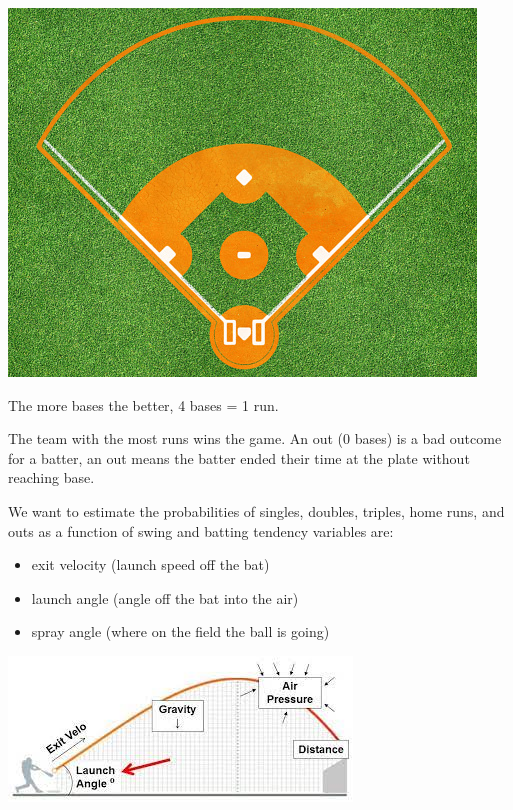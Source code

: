\documentclass[
  ignorenonframetext,
]{beamer}
\providecommand{\tightlist}{%
  \setlength{\itemsep}{0pt}\setlength{\parskip}{0pt}}
\begin{document}
\begin{frame}{}
\protect\hypertarget{section}{}
\includegraphics{baseballfield.jpg}
\end{frame}

\begin{frame}{}
\protect\hypertarget{section-1}{}
The more bases the better, 4 bases = 1 run.

\vspace{12pt}

The team with the most runs wins the game. An out (0 bases) is a bad
outcome for a batter, an out means the batter ended their time at the
plate without reaching base.

\vspace{12pt}

We want to estimate the probabilities of singles, doubles, triples, home
runs, and outs as a function of swing and batting tendency variables
are:

\begin{itemize}
\tightlist
\item
  exit velocity (launch speed off the bat)
\item
  launch angle (angle off the bat into the air)
\item
  spray angle (where on the field the ball is going)
\end{itemize}
\end{frame}

\begin{frame}{}
\protect\hypertarget{section-2}{}
\includegraphics{la.jpg}
\end{frame}
\end{document}
